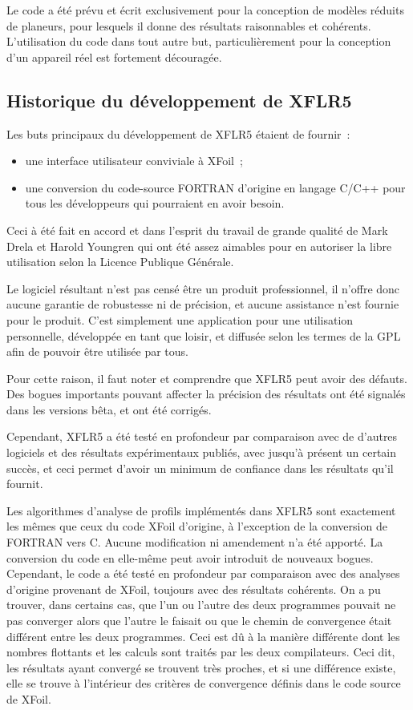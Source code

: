 \documentclass[a4paper,twoside,12pt,dvips]{article}
\begin{document}
Le code a été prévu et écrit exclusivement pour la conception de modèles 
réduits de planeurs, pour lesquels il donne des résultats raisonnables et 
cohérents. L’utilisation du code dans tout autre but, particulièrement pour
la conception d’un appareil réel est fortement découragée.

\subsection{Historique du développement de XFLR5}
Les buts principaux du développement de XFLR5 étaient de fournir~:
\begin{itemize}
  \item une interface utilisateur conviviale à XFoil~; 
  \item une conversion du code-source FORTRAN d’origine en langage C/C++
  pour tous les développeurs qui pourraient en avoir besoin.
\end{itemize}

Ceci à été fait en accord et dans l’esprit du travail de grande qualité de 
Mark Drela et Harold Youngren qui ont été assez aimables pour en autoriser
la libre utilisation selon la Licence Publique Générale. 

Le logiciel résultant n’est pas censé être un produit professionnel, il 
n’offre donc aucune garantie de robustesse ni de précision, et aucune
assistance n’est fournie pour le produit. C’est simplement une application
pour une utilisation personnelle, développée en tant que loisir, et diffusée
selon les termes de la GPL afin de pouvoir être utilisée par tous.

Pour cette raison, il faut noter et comprendre que XFLR5 peut avoir des défauts. Des bogues importants pouvant affecter la précision des résultats ont été signalés dans les versions bêta, et ont été corrigés.

Cependant, XFLR5 a été testé en profondeur par comparaison avec de d’autres
logiciels et des résultats expérimentaux publiés, avec jusqu’à présent un
certain succès, et ceci permet d’avoir un minimum de confiance dans les 
résultats qu’il fournit.

Les algorithmes d’analyse de profils implémentés dans XFLR5 sont exactement 
les mêmes que ceux du code XFoil d’origine, à l’exception de la conversion
de FORTRAN vers C. Aucune modification ni amendement n’a été apporté. La
conversion du code en elle-même peut avoir introduit de nouveaux bogues.
Cependant, le code a été testé en profondeur par comparaison avec des
analyses d’origine provenant de XFoil, toujours avec des résultats cohérents.
On a pu trouver, dans certains cas, que l’un ou l’autre des deux programmes
pouvait ne pas converger alors que l’autre le faisait ou que le chemin de
convergence était différent entre les deux programmes. Ceci est dû à la
manière différente dont les nombres flottants et les calculs sont traités
par les deux compilateurs. Ceci dit, les résultats ayant convergé se
trouvent très proches, et si une différence existe, elle se trouve à
l’intérieur des critères de convergence définis dans le code source de
XFoil.
\end{document}
